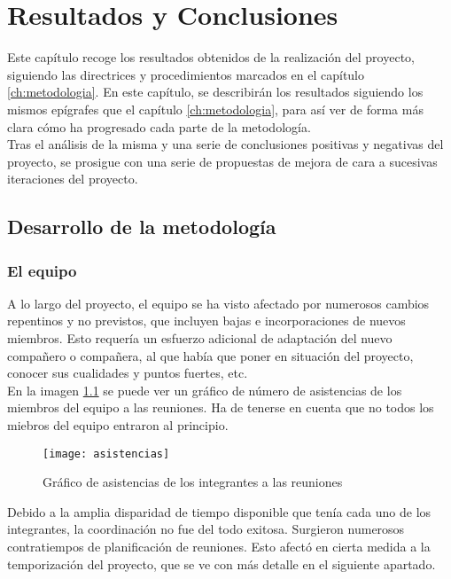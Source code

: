 \chapter{Resultados y Conclusiones}
\label{ch:conclusiones}
Este capítulo recoge los resultados obtenidos de la realización del proyecto, siguiendo las directrices y procedimientos marcados en el capítulo \ref{ch:metodologia}. En este capítulo, se describirán los resultados siguiendo los mismos epígrafes que el capítulo \ref{ch:metodologia}, para así ver de forma más clara cómo ha progresado cada parte de la metodología.\\

Tras el análisis de la misma y una serie de conclusiones positivas y negativas del proyecto, se prosigue con una serie de propuestas de mejora de cara a sucesivas iteraciones del proyecto.

\section{Desarrollo de la metodología}
\subsection{El equipo}
A lo largo del proyecto, el equipo se ha visto afectado por numerosos cambios repentinos y no previstos, que incluyen bajas e incorporaciones de nuevos miembros. Esto requería un esfuerzo adicional de adaptación del nuevo compañero o compañera, al que había que poner en situación del proyecto, conocer sus cualidades y puntos fuertes, etc.\\

En la imagen \ref{asistencias} se puede ver un gráfico de número de asistencias de los miembros del equipo a las reuniones. Ha de tenerse en cuenta que no todos los miebros del equipo entraron al principio.\\

\begin{figure}
    \centering
    \texttt{[image: asistencias]}
    \caption{Gráfico de asistencias de los integrantes a las reuniones}
    \label{asistencias}
\end{figure}

Debido a la amplia disparidad de tiempo disponible que tenía cada uno de los integrantes, la coordinación no fue del todo exitosa. Surgieron numerosos contratiempos de planificación de reuniones. Esto afectó en cierta medida a la temporización del proyecto, que se ve con más detalle en el siguiente apartado.\\

